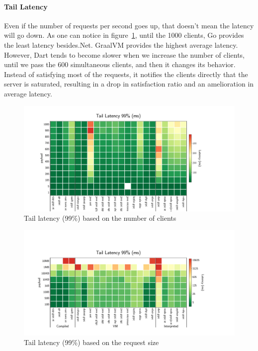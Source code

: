 \paragraph{Tail Latency}
Even if the number of requests per second goes up, that doesn't mean the latency will go down.
As one can notice in figure~\ref{fig:tail99_clients}, until the 1000 clients, Go provides the least latency besides.Net.
GraalVM provides the highest average latency.
However, Dart tends to become slower when we increase the number of clients, until we pass the 600 simultaneous clients, and then it changes its behavior. Instead of satisfying most of the requests, it notifies the clients directly that the server is saturated, resulting in a drop in satisfaction ratio and an amelioration in average latency.

\begin{figure}[!hbt]
    \begin{center}
        \includegraphics[width=1.2\linewidth]{imgs/tail99_clients}
    \end{center}
    \caption{Tail latency (99\%) based on the number of clients}\label{fig:tail99_clients}
\end{figure}


\begin{figure}[!hbt]
    \begin{center}
        \includegraphics[width=1.2\linewidth]{imgs/tail99_payload}
    \end{center}
    \caption{Tail latency (99\%) based on the request size}\label{fig:tail99_payload}
\end{figure}


